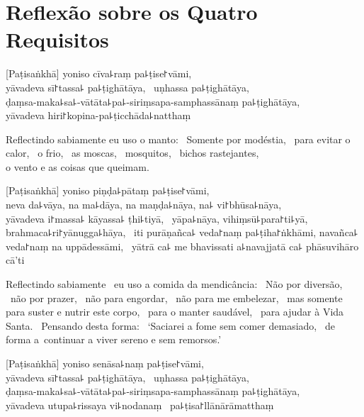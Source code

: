 \chapter[Quatro Requisitos]{Reflexão sobre os Quatro Requisitos}


\begin{leader}
\end{leader}

[Paṭisaṅkhā] yoniso cīva꜕raṃ pa꜕ṭise꜓vāmi, \pause\\
yāvadeva sī꜓tassa꜕ pa꜕ṭighātāya, \pause\ uṇhassa pa꜕ṭighātāya, \pause\\
ḍaṃsa-maka꜕sa꜕-vātāta꜕pa꜕-siriṃsapa-samphassānaṃ pa꜕ṭighātāya, \pause\\
yāvadeva hiri꜓kopina-pa꜕ṭicchāda꜕natthaṃ

\begin{english}
  Reflectindo sabiamente eu uso o manto: \pause\ Somente por modéstia, \pause\
  para evitar o calor, \pause\ o frio, \pause\ as moscas, \pause\ mosquitos,
  \pause\ bichos rastejantes, \pause\\ o vento e as coisas que queimam.
\end{english}

[Paṭisaṅkhā] yoniso piṇḍa꜕pātaṃ pa꜕ṭise꜓vāmi, \pause\\
neva da꜕vāya, na ma꜕dāya, na maṇḍa꜕nāya, na꜕ vi꜓bhūsa꜕nāya, \pause\\
yāvadeva i꜓massa꜕ kāyassa꜕ ṭhi꜕tiyā, \pause\ yāpa꜕nāya, vihiṃsū꜕para꜓ti꜕yā, \pause\\
brahmaca꜕ri꜓yānugga꜕hāya, \pause\ iti purāṇañca꜕ veda꜓naṃ pa꜕ṭiha꜓ṅkhāmi,
navañca꜕ veda꜓naṃ na uppādessāmi, \pause\ yātrā ca꜕ me bhavissati a꜕navajjatā
ca꜕ phāsuvihāro cā'ti

\begin{english}
  Reflectindo sabiamente \pause\ eu uso a comida da mendicância: \pause\ Não por
  diversão, \pause\ não por prazer, \pause\ não para engordar, \pause\ não para
  me embelezar, \pause\ mas somente para suster e nutrir este corpo, \pause\
  para o manter saudável, \pause\ para ajudar à Vida Santa. \pause\ Pensando
  desta forma: \pause\ `Saciarei a fome sem comer demasiado, \pause\ de
  forma a~continuar a viver sereno e sem remorsos.'
\end{english}

\clearpage

[Paṭisaṅkhā] yoniso senāsa꜕naṃ pa꜕ṭise꜓vāmi, \pause\\
yāvadeva sī꜓tassa꜕ pa꜕ṭighātāya, \pause\ uṇhassa pa꜕ṭighātāya, \pause\\
ḍaṃsa-maka꜕sa꜕-vātāta꜕pa꜕-siriṃsapa-samphassānaṃ pa꜕ṭighātāya, \pause\\
yāvadeva utupa꜕rissaya vi꜕nodanaṃ \pause\ pa꜕ṭisa꜓llānārāmatthaṃ

